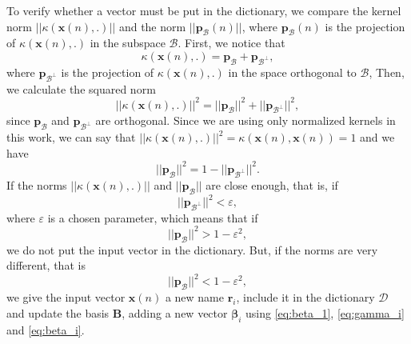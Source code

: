 To verify whether a vector must be put in the dictionary, we compare the kernel norm $||\kappa(\mathbf{x}(n),.)||$ and the norm $||\mathbf{p}_\mathcal{B}(n)||$, where $\mathbf{p}_\mathcal{B}(n)$ is the projection of $\kappa(\mathbf{x}(n),.)$ in the subspace $\mathcal{B}$. 
First, we notice that 
\begin{equation}
    \kappa(\mathbf{x}(n),.) = \mathbf{p}_{\mathcal{B}} + \mathbf{p}_{\mathcal{B}^{\perp}},
\end{equation}
where $\mathbf{p}_{\mathcal{B}^{\perp}}$ is the projection of $\kappa(\mathbf{x}(n),.)$ in the space orthogonal to $\mathcal{B}$, Then, we calculate the squared norm
\begin{equation}
    ||\kappa(\mathbf{x}(n),.)||^2 = ||\mathbf{p}_\mathcal{B}||^2 + ||\mathbf{p}_{\mathcal{B}^{\perp}}||^2,
\end{equation}
since $\mathbf{p}_{\mathcal{B}}$ and $\mathbf{p}_{\mathcal{B}^{\perp}}$ are orthogonal. Since we are using only normalized kernels in this work, we can say that $||\kappa(\mathbf{x}(n),.)||^2 = \kappa(\mathbf{x}(n),\mathbf{x}(n)) = 1$ and we have
\begin{equation}
    ||\mathbf{p}_\mathcal{B}||^2 = 1 - ||\mathbf{p}_{\mathcal{B}^{\perp}}||^2.
\end{equation}
If the norms $||\kappa(\mathbf{x}(n),.)||$ and $||\mathbf{p}_\mathcal{B}||$ are close enough, that is, if 
\begin{equation}
    ||\mathbf{p}_{\mathcal{B}^{\perp}}||^2 < \varepsilon,
\end{equation}
where $\varepsilon$ is a chosen parameter, which means that if
\begin{equation}
    ||\mathbf{p}_\mathcal{B}||^2 > 1 - \varepsilon^2,
\end{equation}
we do not put the input vector in the dictionary. But, if the norms are very different, that is
\begin{equation}
    ||\mathbf{p}_\mathcal{B}||^2 < 1 - \varepsilon^2,
\end{equation}
we give the input vector $\mathbf{x}(n)$ a new 
name $\mathbf{r}_i$, include it in the dictionary $\mathcal{D}$ and update the basis $\mathbf{B}$, adding a new vector $\boldsymbol{\beta}_i$ using \eqref{eq:beta_1}, \eqref{eq:gamma_i} and \eqref{eq:beta_i}.

